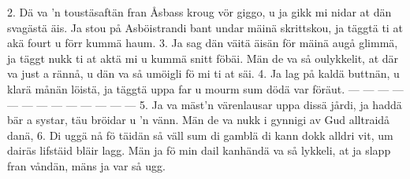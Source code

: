 2.  Dä va ’n toustäsaftän fran Åsbass kroug vör giggo,
    u ja gikk mi nidar at dän svagästä äis.
    Ja stou på Asböistrandi bant undar mäinä skrittskou,
    ja täggtä ti at akä fourt u förr kummä haum.
3.  Ja sag dän väitä äisän för mäinä augå glimmä,
    ja täggt nukk ti at aktä mi u kummä snitt föbäi.
    Män de va så oulykkelit, at där va just a rännå,
    u dän va så umöigli fö mi ti at säi.
4.  Ja lag på kaldä buttnän, u klarä månän löistä,
    ja täggtä uppa far u mourm sum dödä var föräut.
    — — — — — — — — — — — — —
5.  Ja va mäst’n värenlausar uppa dissä jårdi,
    ja haddä bär a systar, täu bröidar u ’n vänn.
    Män de va nukk i gynnigi av Gud alltraidå danä,
6.  Di uggä nå fö täidän så väll sum di gamblä
    di kann dokk alldri vit, um dairäs lifstäid bläir lagg.
    Män ja fö min dail kanhändä va så lykkeli,
    at ja slapp fran våndän, mäns ja var så ugg.
